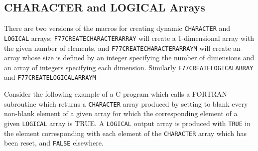 \documentclass[twoside,11pt]{article}
\newcommand{\htmlref}[2]{#1}
\newcommand{\xlabel}[1]{}
\renewcommand{\_}{\texttt{\symbol{95}}}
\begin{document}
\subsection{\xlabel{character_and_logical_arrays}\label{char_arrays}CHARACTER and LOGICAL Arrays}
There are two versions of the macros for creating dynamic \texttt{CHARACTER}
and \texttt{LOGICAL} arrays: 
\htmlref{\texttt{F77\_CREATE\_CHARACTER\_ARRAY}}{F77_CREATE_CHARACTER_ARRAY}
will create a 1-dimensional array with the given number of elements, and
\htmlref{\texttt{F77\_CREATE\_CHARACTER\_ARRAY\_M}}
        {F77_CREATE_CHARACTER_ARRAY\_M}
will create an array whose size is defined by an integer specifying the number
of dimensions and an array of integers specifying each dimension.
Similarly
\htmlref{\texttt{F77\_CREATE\_LOGICAL\_ARRAY}}{F77_CREATE_type_ARRAY}
and
\htmlref{\texttt{F77\_CREATE\_LOGICAL\_ARRAY\_M}}
        {F77_CREATE_LOGICAL_ARRAY\_M}

Consider the following example of a C program which calls a FORTRAN subroutine
which returns a \texttt{CHARACTER} array produced by setting to blank every 
non-blank element of a given array for which the corresponding element of a 
given \texttt{LOGICAL} array is TRUE. A \texttt{LOGICAL} output array is 
produced with \texttt{TRUE} in the element corresponding with each element of 
the \texttt{CHARACTER} array which has been reset, and \texttt{FALSE} elsewhere.
\end{document}
